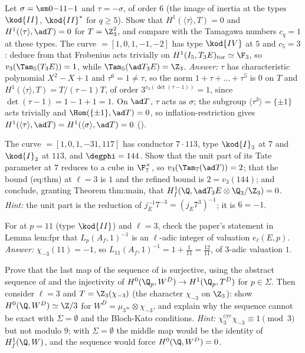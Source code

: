 \begin{exercise}[inertia of order $6$, and type $\kod{IV}$, at $\ell=3$]\label{ex:blochkato:ex-c3}
Let $\sigma=\sm0{-1}1{-1}$ and $\tau=-\sigma$, of order $6$ (the image of inertia at the types $\kod{II}$, $\kod{II}^*$ for $q\ge5$). Show that $H^1(\langle\tau\rangle,T)=0$ and
$H^1(\langle\tau\rangle,\ad T)=0$ for $T=\Z_3^2$, and compare with the Tamagawa numbers $c_q=1$ at these types. The curve  $=[1,0,1,-1,-2]$ has type $\kod{IV}$ at $5$ and $c_5=3$: deduce from  that Frobenius acts
trivially on $H^1(I_5,T_3E)_{\mathrm{tor}}\simeq\F_3$, so $v_3(\Tam_5(T_3E))=1$, while $\Tam_5(\ad T_3E)=\Z_3$.
\emph{Answer:} $\tau$ has characteristic polynomial $X^2-X+1$ and $\tau^6=1\ne\tau$, so the norm $1+\tau+\dots+\tau^5$ is $0$ on $T$ and $H^1(\langle\tau\rangle,T)=T/(\tau-1)T$, of order
$3^{v_3(\det(\tau-1))}=1$, since $\det(\tau-1)=1-1+1=1$. On $\ad T$, $\tau$ acts as $\sigma$; the subgroup $\langle\tau^3\rangle=\{\pm1\}$ acts trivially and $\Hom(\{\pm1\},\ad T)=0$, so inflation-restriction
gives $H^1(\langle\tau\rangle,\ad T)=H^1(\langle\sigma\rangle,\ad T)=0$ ().
\end{exercise}

\begin{exercise}\label{ex:blochkato:ex-791}
The curve  $=[1,0,1,-31,117]$ has conductor $7\cdot113$, type $\kod{I}_3$ at $7$ and $\kod{I}_2$ at $113$, and $\degphi=144$. Show that the unit part of its Tate parameter
at $7$ reduces to a cube in $\F_7^\times$, so $v_3(\Tam_7(\ad T))=2$; that the bound (eq:thm) at $\ell=3$ is $1$ and the refined bound is $2=v_3(144)$; and conclude, granting
Theorem thm:main, that $H^1_f(\Q,\ad T_3E\otimes\Q_3/\Z_3)=0$.
\emph{Hint:} the unit part is the reduction of $j_E^{-1}7^{-3}=(j_E7^3)^{-1}$; it is $6=-1$.
\end{exercise}

\begin{exercise}\label{ex:blochkato:ex-121}
For  at $p=11$ (type $\kod{II}$) and $\ell=3$, check the paper's statement in Lemma lem:fpr that $L_p(A_f,1)^{-1}$ is an $\ell$-adic integer of valuation $e_\ell(E,p)$.
\emph{Answer:} $\chi_{-3}(11)=-1$, so $L_{11}(A_f,1)^{-1}=1+\tfrac1{11}=\tfrac{12}{11}$, of $3$-adic valuation $1$.
\end{exercise}

\begin{exercise}\label{ex:blochkato:ex-surj}
Prove that the last map of the sequence of  is surjective, using the abstract sequence of  and the injectivity of
$H^0(\Q_p,W^D)\to H^1(\Q_p,T^D)$ for $p\in\Sigma$. Then consider $\ell=3$ and $T=\Z_3(\chi_{-3})$ (the character $\chi_{-3}$ on $\Z_3$): show $H^0(\Q,W^D)\simeq\Z/3$ for $W^D=\mu_{3^\infty}\otimes\chi_{-3}$, and
explain why the sequence cannot be exact with $\Sigma=\emptyset$ and the Bloch-Kato conditions.
\emph{Hint:} $\chi_3^{\mathrm{cyc}}\chi_{-3}\equiv1\pmod3$ but not modulo $9$; with $\Sigma=\emptyset$ the middle map would be the identity of $H^1_f(\Q,W)$, and the sequence would force $H^0(\Q,W^D)=0$.
\end{exercise}


